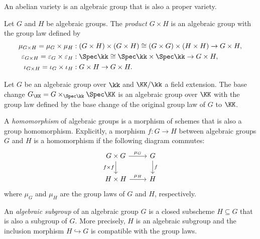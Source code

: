     \begin{example}\label{eg:abelian_varieties_as_algebraic_groups}
        An abelian variety is an algebraic group that is also a proper variety.
    \end{example}

    \begin{example}\label{eg:product_of_algebraic_groups}
        Let \(G\) and \(H\) be algebraic groups.
        The \emph{product} \(G \times H\) is an algebraic group with the group law defined by
        \begin{align*}
            \mu_{G \times H} = \mu_G \times \mu_H &: (G \times H) \times (G \times H) \cong (G \times G) \times (H \times H) \to G \times H, \\   
            \varepsilon_{G \times H} = \varepsilon_G \times \varepsilon_H &: \Spec \kk \cong \Spec \kk \times \Spec \kk \to G \times H, \\
            \iota_{G \times H} = \iota_G \times \iota_H &: G \times H \to G \times H.
        \end{align*}
    \end{example}

    \begin{example}\label{eg:base_change_of_algebraic_groups}
        Let \(G\) be an algebraic group over \(\kk\) and \(\KK/\kk\) a field extension.
        The base change \(G_\KK = G \times_{\Spec \kk} \Spec \KK\) is an algebraic group over \(\KK\) with the group law defined by the base change of the original group law of \(G\) to \(\KK\).
    \end{example}

    \begin{definition}\label{def:homomorphism_of_algebraic_groups}
        A \emph{homomorphism} of algebraic groups is a morphism of schemes that is also a group homomorphism.
        Explicitly, a morphism \(f: G \to H\) between algebraic groups \(G\) and \(H\) is a homomorphism if the following diagram commutes:
        \[
            \begin{tikzcd}
                G \times G \arrow{r}{\mu_G} \arrow[d, "f\times f" swap] & G \arrow{d}{f} \\
                H \times H \arrow{r}{\mu_H} & H
            \end{tikzcd}
        \]
        where \(\mu_G\) and \(\mu_H\) are the group laws of \(G\) and \(H\), respectively.
    \end{definition}

    \begin{definition}\label{def:algebraic_subgroup}
        An \emph{algebraic subgroup} of an algebraic group \(G\) is a closed subscheme \(H \subseteq G\) that is also a subgroup of \(G\).
        More precisely, \(H\) is an algebraic subgroup and the inclusion morphism \(H \hookrightarrow G\) is compatible with the group laws.
    \end{definition}

